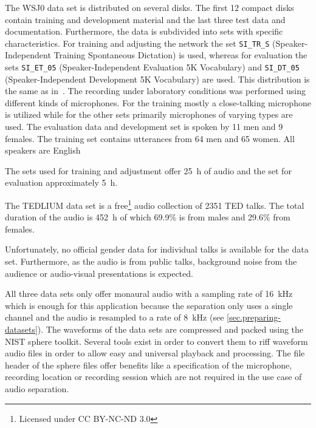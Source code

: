 The WSJ0 data set is distributed on several disks. The first 12 compact disks contain training and development material and the last three test data and documentation. Furthermore, the data is subdivided into sets with specific characteristics. For training and adjusting the network the set
\texttt{SI\_TR\_S} (Speaker-Independent Training Spontaneous Dictation) %
is used, whereas for evaluation the sets
\texttt{SI\_ET\_05} (Speaker-Independent Evaluation 5K Vocabulary) %
and
\texttt{SI\_DT\_05} (Speaker-Independent Development 5K Vocabulary) %
are used. This distribution is the same as in~\cite{Hershey2016}. The recording under laboratory conditions was performed using different kinds of microphones. For the training mostly a close-talking microphone is utilized while for the other sets primarily microphones of varying types are used.
The evaluation data and development set is spoken by 11 men and 9 females. The training set contains utterances from 64 men and 65 women. All speakers are English~\cite[Documentation and speaker information]{Garofolo1994}

The sets used for training and adjustment offer \SI{25}{h} of audio and the set for evaluation approximately \SI{5}{h}.

The TEDLIUM data set is a free\footnote{Licensed under CC BY-NC-ND 3.0} audio collection of 2351 TED talks. The total duration of the audio is \SI{452}{h} of which 69.9\% is from males and 29.6\% from females.~\cite{Hernandez2018}

Unfortunately, no official gender data for individual talks is available for the data set. Furthermore, as the audio is from public talks, background noise from the audience or audio-visual presentations is expected.

All three data sets only offer monaural audio with a sampling rate of \SI{16}{\kHz} which is enough for this application because the separation only uses a single channel and the audio is resampled to a rate of \SI{8}{\kHz} (see \ref{sec.preparing-datasets}).
The waveforms of the data sets are compressed and packed using the NIST \gls{sphere} toolkit. Several tools exist in order to convert them to \gls{riff} waveform audio files in order to allow easy and universal playback and processing. The file header of the \gls{sphere} files offer benefits like a specification of the microphone, recording location or recording session which are not required in the use case of audio separation.


